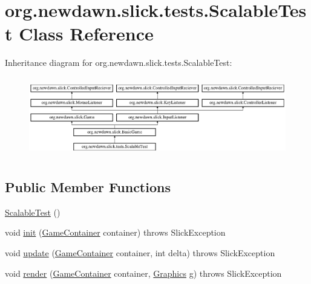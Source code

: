 \hypertarget{classorg_1_1newdawn_1_1slick_1_1tests_1_1_scalable_test}{}\section{org.\+newdawn.\+slick.\+tests.\+Scalable\+Test Class Reference}
\label{classorg_1_1newdawn_1_1slick_1_1tests_1_1_scalable_test}
Inheritance diagram for org.\+newdawn.\+slick.\+tests.\+Scalable\+Test\+:\begin{figure}[H]
\begin{center}
\leavevmode
\includegraphics[height=3.522012cm]{classorg_1_1newdawn_1_1slick_1_1tests_1_1_scalable_test}
\end{center}
\end{figure}
\subsection*{Public Member Functions}
\begin{DoxyCompactItemize}
\item 
\mbox{\hyperlink{classorg_1_1newdawn_1_1slick_1_1tests_1_1_scalable_test_a9ca75a0468482f8eb516d1f4814f29f2}{Scalable\+Test}} ()
\item 
void \mbox{\hyperlink{classorg_1_1newdawn_1_1slick_1_1tests_1_1_scalable_test_a99f4c97d1a23306b8313fbb32fd09451}{init}} (\mbox{\hyperlink{classorg_1_1newdawn_1_1slick_1_1_game_container}{Game\+Container}} container)  throws Slick\+Exception 
\item 
void \mbox{\hyperlink{classorg_1_1newdawn_1_1slick_1_1tests_1_1_scalable_test_a2184ee570246755838d5a754328d1e1a}{update}} (\mbox{\hyperlink{classorg_1_1newdawn_1_1slick_1_1_game_container}{Game\+Container}} container, int delta)  throws Slick\+Exception 
\item 
void \mbox{\hyperlink{classorg_1_1newdawn_1_1slick_1_1tests_1_1_scalable_test_a56ccbb0f6633035a9901e9605e17b626}{render}} (\mbox{\hyperlink{classorg_1_1newdawn_1_1slick_1_1_game_container}{Game\+Container}} container, \mbox{\hyperlink{classorg_1_1newdawn_1_1slick_1_1_graphics}{Graphics}} g)  throws Slick\+Exception 
\end{DoxyCompactItemize}
